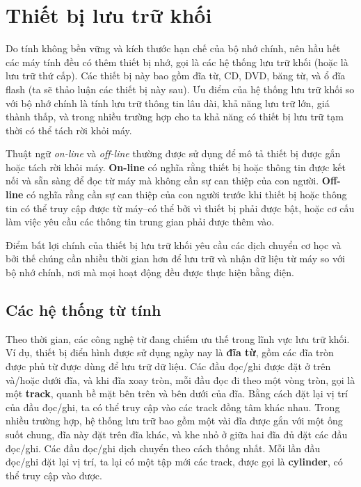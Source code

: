 \section{Thiết bị lưu trữ khối}

Do tính không bền vững và kích thước hạn chế của bộ nhớ chính, nên hầu hết các máy tính
đều có thêm thiết bị nhớ,  gọi là các hệ thống lưu trữ khối (hoặc là lưu trữ thứ
cấp). Các thiết bị này bao gồm đĩa từ, CD, DVD, băng từ, và ổ đĩa flash (ta sẽ thảo luận
các thiết bị này sau). Ưu điểm của hệ thống lưu trữ khối so với bộ nhớ chính là tính lưu
trữ thông tin lâu dài, khả năng lưu trữ lớn, giá thành thấp, và trong nhiều trường hợp cho
ta khả năng có thiết bị lưu trữ tạm thời có thể tách rời khỏi máy.

Thuật ngữ \textit{on-line} và \textit{off-line} thường được sử dụng để mô tả thiết bị được
gắn hoặc tách rời khỏi máy. \textbf{On-line} có nghĩa rằng thiết bị hoặc thông tin được
kết nối và sẵn sàng để đọc từ máy mà không cần sự can thiệp của con
người. \textbf{Off-line} có nghĩa rằng cần sự can thiệp của con người trước khi thiết bị
hoặc thông tin có thể truy cập được từ máy--có thể bởi vì thiết bị phải được bật, hoặc cơ
cấu làm việc yêu cầu các thông tin trung gian phải được thêm vào.

Điểm bất lợi chính của thiết bị lưu trữ khối yêu cầu các dịch chuyển cơ học và bởi thế
chúng cần nhiều thời gian hơn để lưu trữ và nhận dữ liệu từ máy so với bộ nhớ chính, nơi
mà mọi hoạt động đều được thực hiện bằng điện.

\subsection*{Các hệ thống từ tính}


Theo thời gian, các công nghệ từ đang chiếm ưu thế trong lĩnh vực lưu trữ khối. Ví dụ, thiết bị  điển hình được  sử dụng ngày nay là \textbf{đĩa từ}, gồm các đĩa tròn được phủ từ được dùng để lưu trữ dữ liệu. Các đầu đọc/ghi được đặt ở trên và/hoặc dưới đĩa, và khi đĩa xoay tròn,
mỗi đầu đọc đi theo một vòng tròn, gọi là một \textbf{track}, quanh bề mặt bên trên và bên
dưới của đĩa. Bằng cách đặt lại vị trí của đầu đọc/ghi, ta có thể truy cập vào các track đồng tâm khác nhau. Trong nhiều trường hợp, hệ thống lưu trữ bao gồm một vài đĩa được gắn
với một ống suốt chung, đĩa này đặt trên đĩa khác, và khe nhỏ ở giữa hai đĩa đủ đặt các
đầu đọc/ghi. Các đầu đọc/ghi dịch chuyển theo cách thống nhất. Mỗi lần đầu đọc/ghi đặt
lại vị trí, ta lại có một tập mới các track, được gọi là \textbf{cylinder}, có thể truy
cập vào được.

